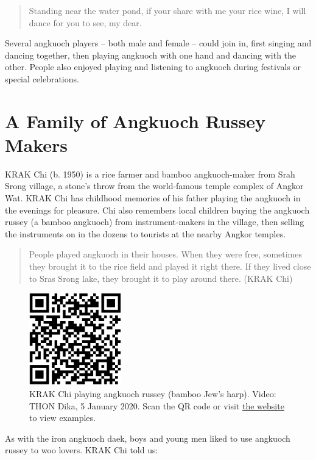 \documentclass[twoside]{article}
\providecommand{\wmturlcaption}{
  Scan the QR code or visit \href{https://worldmusictextbook.org/song-grant-2021}{the website} to view examples.
}
\begin{document}
\begin{quote}
Standing near the water pond, if your share with me your rice wine, I
will dance for you to see, my dear.
\end{quote}

Several angkuoch players -- both male and female -- could join in, first
singing and dancing together, then playing angkuoch with one hand and
dancing with the other. People also enjoyed playing and listening to
angkuoch during festivals or special celebrations.

\hypertarget{a-family-of-angkuoch-russey-makers}{%
\section*{A Family of Angkuoch Russey
Makers}\label{a-family-of-angkuoch-russey-makers}}

KRAK Chi (b. 1950) is a rice farmer and bamboo angkuoch-maker from Srah
Srong village, a stone's throw from the world-famous temple complex of
Angkor Wat. KRAK Chi has childhood memories of his father playing the
angkuoch in the evenings for pleasure. Chi also remembers local children
buying the angkuoch russey (a bamboo angkuoch) from instrument-makers in
the village, then selling the instruments on in the dozens to tourists
at the nearby Angkor temples.

\begin{quote}
People played angkuoch in their houses. When they were free, sometimes
they brought it to the rice field and played it right there. If they
lived close to Sras Srong lake, they brought it to play around there.
(KRAK Chi)
\end{quote}

\begin{figure}
  \centering
  \includegraphics[height=4cm]{song-grant-video-1.png}
  \caption{KRAK Chi playing angkuoch russey (bamboo Jew's harp). Video: THON Dika, 5 January 2020. \wmturlcaption}
\end{figure}

As with the iron angkuoch daek, boys and young men liked to use angkuoch
russey to woo lovers. KRAK Chi told us:
\end{document}
